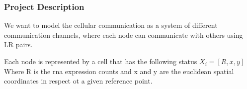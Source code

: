 \begin{frame}
    \frametitle{Project Description}
    \begin{alertblock}{}
        We want to model the cellular communication as a system of different communication channels,
        where each node can communicate with others using LR pairs.
    \end{alertblock}

    \begin{alertblock}{}
        Each node is represented by a cell that has the following status $X_i = [R, x, y]$
        Where R is the rna expression counts and x and y are the euclidean spatial coordinates in
        respect ot a given reference point.
    \end{alertblock}
\end{frame}

